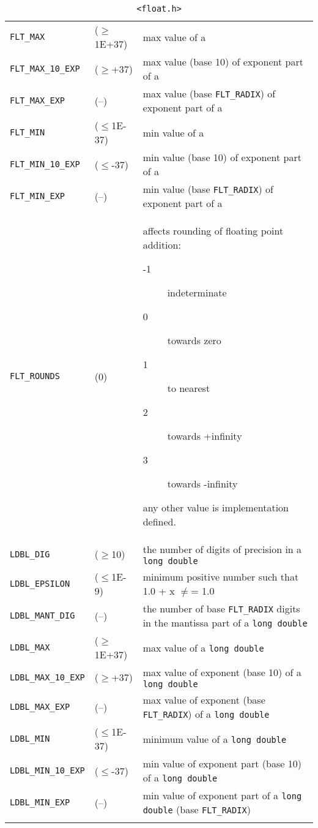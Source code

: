 \begin{longtable}{lp{}p{}}
     \texttt{FLT\_MAX} & ($\geq$1E+37) & max value of a \float{}  \\
     \texttt{FLT\_MAX\_10\_EXP} & ($\geq$+37) & max value (base 10) of exponent part of a \float{}    \\
     \texttt{FLT\_MAX\_EXP} & (--) & max value (base \texttt{FLT\_RADIX}) of exponent part of a \float{} \\
     \texttt{FLT\_MIN} & ($\leq$1E-37) & min value of a \float{} \\
     \texttt{FLT\_MIN\_10\_EXP} & ($\leq$-37) & min value (base 10) of exponent part of a \float{}   \\
     \texttt{FLT\_MIN\_EXP} & (--) & min value (base \texttt{FLT\_RADIX}) of exponent part of a \float{}  \\
     \texttt{FLT\_ROUNDS} & (0) & affects rounding of floating point addition:

      \begin{description}
       \item[-1] indeterminate
       \item[0] towards zero
       \item[1] to nearest
       \item[2] towards +infinity
       \item[3] towards -infinity
      \end{description}
      any other value is implementation defined.    \\

     \texttt{LDBL\_DIG} & ($\geq$10) & the number of digits of precision in a \texttt{long double}    \\
     \texttt{LDBL\_EPSILON} & ($\leq$1E-9) & minimum positive number such that 1.0 + x $\neq$= 1.0    \\
     \texttt{LDBL\_MANT\_DIG} & (--) & the number of base \texttt{FLT\_RADIX} digits in the mantissa part of a \texttt{long double} \\
     \texttt{LDBL\_MAX} & ($\geq$1E+37) & max value of a \texttt{long double} \\
     \texttt{LDBL\_MAX\_10\_EXP} & ($\geq$+37) &  max value of exponent (base 10) of a \texttt{long double} \\
     \texttt{LDBL\_MAX\_EXP} & (--) & max value of exponent (base \texttt{FLT\_RADIX}) of a \texttt{long double} \\
     \texttt{LDBL\_MIN} & ($\leq$1E-37) & minimum value of a \texttt{long double} \\
     \texttt{LDBL\_MIN\_10\_EXP} & ($\leq$-37) & min value of exponent part (base 10) of a \texttt{long double} \\
     \texttt{LDBL\_MIN\_EXP} & (--) & min value of exponent part of a \texttt{long double} (base \texttt{FLT\_RADIX})    \\
    \bottomrule
  \caption{\label{tab:float_h}\texttt{<float.h>}}
\end{longtable}



